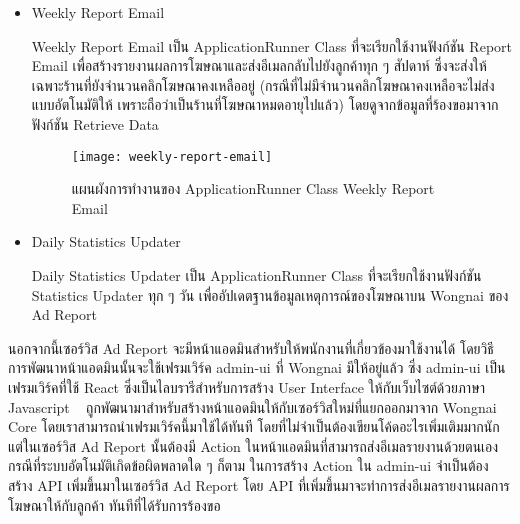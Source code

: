 \begin{enumerate}
	\begin{itemize}
		\item Weekly Report Email
		
		Weekly Report Email  เป็น ApplicationRunner Class ที่จะเรียกใช้งานฟังก์ชัน Report Email เพื่อสร้างรายงานผลการโฆษณาและส่งอีเมลกลับไปยังลูกค้าทุก ๆ สัปดาห์ ซึ่งจะส่งให้เฉพาะร้านที่ยังจำนวนคลิกโฆษณาคงเหลืออยู่ (กรณีที่ไม่มีจำนวนคลิกโฆษณาคงเหลือจะไม่ส่งแบบอัตโนมัติให้ เพราะถือว่าเป็นร้านที่โฆษณาหมดอายุไปแล้ว) โดยดูจากข้อมูลที่ร้องขอมาจากฟังก์ชัน Retrieve Data
	
		\begin{figure}[!h]
			\centering
			\texttt{[image: weekly-report-email]}  
			\caption{แผนผังการทำงานของ ApplicationRunner Class Weekly Report Email}
			\label{Fig:weekly-report-diagram}
		\end{figure}
	
		\item Daily Statistics Updater
	
		Daily Statistics Updater เป็น ApplicationRunner Class ที่จะเรียกใช้งานฟังก์ชัน Statistics Updater ทุก ๆ วัน เพื่ออัปเดตฐานข้อมูลเหตุการณ์ของโฆษณาบน Wongnai ของ Ad Report
	\end{itemize}

	นอกจากนี้เซอร์วิส Ad Report จะมีหน้าแอดมินสำหรับให้พนักงานที่เกี่ยวข้องมาใช้งานได้ โดยวิธีการพัฒนาหน้าแอดมินนั้นจะใช้เฟรมเวิร์ค admin-ui ที่ Wongnai มีให้อยู่แล้ว ซึ่ง admin-ui เป็นเฟรมเวิร์คที่ใช้ React ซึ่งเป็นไลบรารีสำหรับการสร้าง User Interface ให้กับเว็บไซต์ด้วยภาษา Javascript ~\cite{react} ถูกพัฒนามาสำหรับสร้างหน้าแอดมินให้กับเซอร์วิสใหม่ที่แยกออกมาจาก Wongnai Core โดยเราสามารถนำเฟรมเวิร์คนี้มาใช้ได้ทันที โดยที่ไม่จำเป็นต้องเขียนโค้ดอะไรเพิ่มเติมมากนัก แต่ในเซอร์วิส Ad Report นั้นต้องมี Action ในหน้าแอดมินที่สามารถส่งอีเมลรายงานด้วยตนเอง กรณีที่ระบบอัตโนมัติเกิดข้อผิดพลาดใด ๆ ก็ตาม ในการสร้าง Action ใน admin-ui จำเป็นต้องสร้าง API เพิ่มขึ้นมาในเซอร์วิส Ad Report โดย API ที่เพิ่มขึ้นมาจะทำการส่งอีเมลรายงานผลการโฆษณาให้กับลูกค้า ทันทีที่ได้รับการร้องขอ
	

\end{enumerate}
